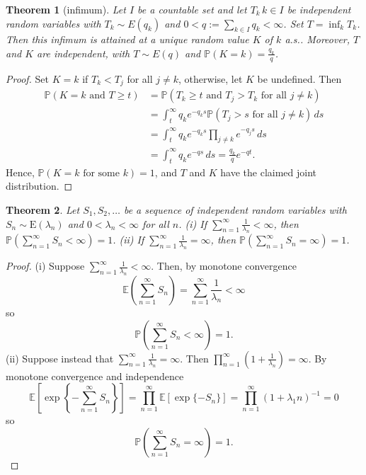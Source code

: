 \documentclass{article}
\newtheorem{Thm}{Theorem}[section]
\theoremstyle{definition}
\newcommand{\PP}{\mathbb{P}}
\renewcommand{\geq}{\geqslant}
\newcommand{\<}{\left\langle}
\renewcommand{\>}{\right\rangle}
\begin{document}
\begin{Thm}[infimum]
    Let $I$ be a countable set and let $T_k\,k\in I$ be independent random variables with $T_k \sim E(q_k)$ and $0 < q := \sum_{k\in I} q_k < \infty$. 
    Set $T = \inf_k T_k$. Then this infimum is attained at a unique random value $K$ of $k$ a.s.. Moreover, $T$ and $K$ are independent, with $T \sim E(q)$ and $\PP(K = k) = \frac{q_k}{q}$.

\end{Thm}
\begin{proof}
    Set \(K = k\) if \(T_k < T_j\) for all \(j \neq k\), otherwise, let \(K\) be undefined. Then
\[
\begin{aligned}
\PP(K = k \text{ and } T \geq t) &= \PP(T_k \geq t \text{ and } T_j > T_k \text{ for all } j \neq k) \\
&= \int_{t}^{\infty} q_k e^{-q_k s} \PP(T_j > s \text{ for all } j \neq k) \, ds \\
&= \int_{t}^{\infty} q_k e^{-q_k s} \prod_{j \neq k} e^{-q_j s} \, ds \\
&= \int_{t}^{\infty} q_k e^{-qs} \, ds = \frac{q_k}{q} e^{-qt}.
\end{aligned}
\]
Hence, \(\PP(K = k \text{ for some } k) = 1\), and \(T\) and \(K\) have the claimed joint distribution.

\end{proof}

\begin{Thm}
    Let \(S_1, S_2, \ldots\) be a sequence of independent random variables with \(S_n \sim \text{E}(\lambda_n)\) and \(0 < \lambda_n < \infty\) for all \(n\).\newline 
    (i) If \(\sum_{n=1}^{\infty} \frac{1}{\lambda_n} < \infty\), then \(\PP \left(\sum_{n=1}^{\infty} S_n < \infty\right) = 1\).\newline
    (ii) If \(\sum_{n=1}^{\infty} \frac{1}{\lambda_n} = \infty\), then \(\PP \left(\sum_{n=1}^{\infty} S_n = \infty\right) = 1\).
    
\end{Thm}
\begin{proof}
    (i) Suppose \(\sum_{n=1}^{\infty} \frac{1}{\lambda_n} < \infty\). Then, by monotone convergence
\[
\mathbb{E} \left( \sum_{n=1}^{\infty} S_n \right) = \sum_{n=1}^{\infty} \frac{1}{\lambda_n} < \infty
\]
so
\[
\mathbb{P} \left( \sum_{n=1}^{\infty} S_n < \infty \right) = 1.
\]
(ii) Suppose instead that \(\sum_{n=1}^{\infty} \frac{1}{\lambda_n} = \infty\). Then \(\prod_{n=1}^{\infty} (1 + \frac{1}{\lambda_n}) = \infty\).
By monotone convergence and independence
\[
\mathbb{E} \left[ \exp\left\{- \sum_{n=1}^{\infty} S_n \right\} \right] = \prod_{n=1}^{\infty} \mathbb{E} \left[ \exp\{-S_n\} \right] = \prod_{n=1}^{\infty} (1 + \lambda_1 n)^{-1} = 0
\]
so
\[
\mathbb{P} \left( \sum_{n=1}^{\infty} S_n = \infty \right) = 1.
\]

\end{proof}
\end{document}
